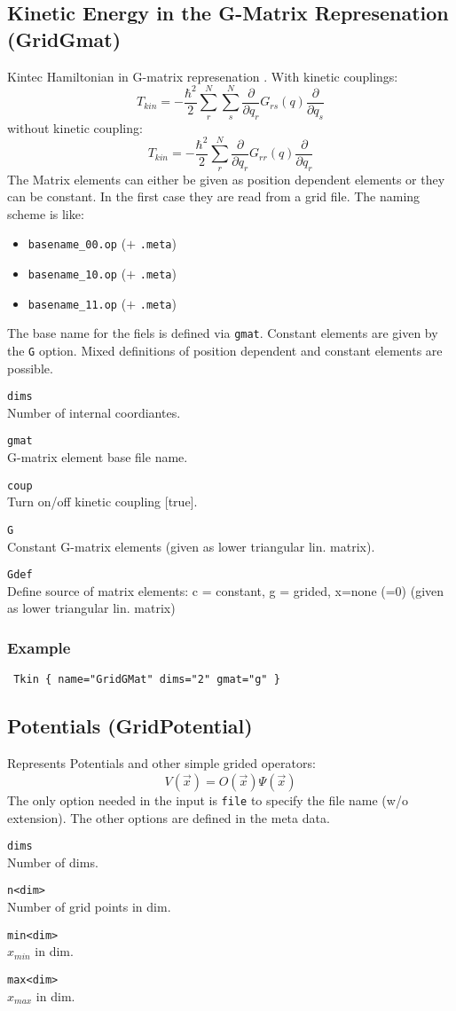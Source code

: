 \documentclass[a4paper,12pt]{scrbook}
\newcommand{\option}[2]{\item \texttt{#1}\\ #2}
\begin{document}
\subsection{Kinetic Energy in the G-Matrix Represenation (GridGmat)}
Kintec Hamiltonian in G-matrix represenation \cite{Stare03}. With kinetic 
couplings:
\begin{equation}
 T_{kin} = -\frac{\hbar^2}{2} \sum_r^N \sum_s^N \frac{\partial}{\partial q_r} G_{rs}(q) \frac{\partial}{\partial q_s}
\end{equation}
without kinetic coupling:
\begin{equation}
 T_{kin} = -\frac{\hbar^2}{2} \sum_r^N \frac{\partial}{\partial q_r} G_{rr}(q) \frac{\partial}{\partial q_r}
\end{equation}
The Matrix elements can either be given as position dependent elements or they can be constant.
In the first case they are read from a grid file. The naming scheme is like:
\begin{itemize}
 \item \verb|basename_00.op| ($+$ \verb|.meta|)
 \item \verb|basename_10.op| ($+$ \verb|.meta|)
 \item \verb|basename_11.op| ($+$ \verb|.meta|)
\end{itemize}
The base name for the fiels is defined via \verb|gmat|. Constant elements are given by the \verb|G| option.
Mixed definitions of position dependent and constant elements are possible.

\begin{options}
\option{dims}{Number of internal coordiantes.} 
\option{gmat}{G-matrix element base file name.}
\option{coup}{Turn on/off kinetic coupling [true].}
\option{G}{Constant G-matrix elements (given as lower triangular lin. matrix).}
\option{Gdef}{Define source of matrix elements: c = constant, g = grided, x=none (=0) (given as lower triangular lin. matrix)}
\end{options}

\subsubsection*{Example}
\begin{verbatim}
 Tkin { name="GridGMat" dims="2" gmat="g" }
\end{verbatim}

\subsection{Potentials (GridPotential)}
Represents Potentials and other simple grided operators:
\begin{equation}
 V(\vec{x}) = \hat O(\vec{x}) \Psi(\vec{x})
\end{equation}
The only option needed in the input is \verb|file| to specify the file name (w/o extension).
The other options are defined in the meta data.
\begin{options}
 \option{dims}{Number of dims.}
 \option{n<dim>}{Number of grid points in dim.}
 \option{min<dim>}{$x_{min}$ in dim.}
 \option{max<dim>}{$x_{max}$ in dim.}
\end{options}
\end{document}
